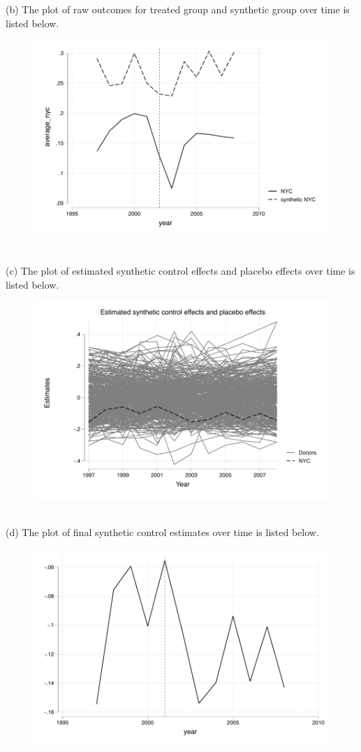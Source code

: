 \documentclass{article}
\begin{document}
(b) The plot of raw outcomes for treated group and synthetic group over time is listed below. 
\begin{figure}[H]
\centering
\includegraphics[scale = 0.9]{question5b.pdf}	
\end{figure}

~\\

(c) The plot of estimated synthetic control effects and placebo effects over time is listed below. 
\begin{figure}[H]
\centering
\includegraphics[scale = 0.9]{question5c.pdf	}
\end{figure}



~\\

(d) The plot of final synthetic control estimates over time is listed below. 

\begin{figure}[H]
\centering
\includegraphics[scale = 0.9]{question5d.pdf	}
\end{figure}
\end{document}
